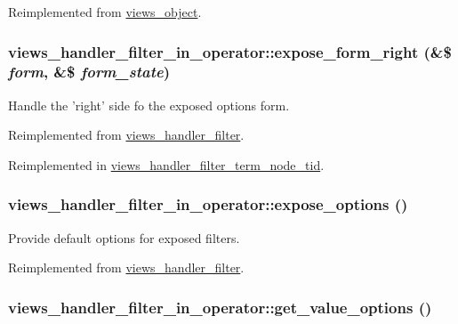 Reimplemented from \hyperlink{classviews__object_6583d6be7e59dd1e39056e320ea2c2d4}{views\_\-object}.\hypertarget{classviews__handler__filter__in__operator_512acf0d0d577f3c87882d08e9808880}{
\subsubsection[{expose\_\-form\_\-right}]{\setlength{\rightskip}{0pt plus 5cm}views\_\-handler\_\-filter\_\-in\_\-operator::expose\_\-form\_\-right (\&\$ {\em form}, \/  \&\$ {\em form\_\-state})}}
\label{classviews__handler__filter__in__operator_512acf0d0d577f3c87882d08e9808880}


Handle the 'right' side fo the exposed options form. 

Reimplemented from \hyperlink{classviews__handler__filter_5f175df5f03b5e4e23e4168870de05d8}{views\_\-handler\_\-filter}.

Reimplemented in \hyperlink{classviews__handler__filter__term__node__tid_6a3523271cc4bd41ae944dd38bf24b37}{views\_\-handler\_\-filter\_\-term\_\-node\_\-tid}.\hypertarget{classviews__handler__filter__in__operator_0ed328117721ce41a3744f0339c16527}{
\subsubsection[{expose\_\-options}]{\setlength{\rightskip}{0pt plus 5cm}views\_\-handler\_\-filter\_\-in\_\-operator::expose\_\-options ()}}
\label{classviews__handler__filter__in__operator_0ed328117721ce41a3744f0339c16527}


Provide default options for exposed filters. 

Reimplemented from \hyperlink{classviews__handler__filter_07ab6afc47bf892fb5fd5934c3f1d64c}{views\_\-handler\_\-filter}.\hypertarget{classviews__handler__filter__in__operator_a5b5df6d90f4359ed28c0c446bdc81a6}{
\subsubsection[{get\_\-value\_\-options}]{\setlength{\rightskip}{0pt plus 5cm}views\_\-handler\_\-filter\_\-in\_\-operator::get\_\-value\_\-options ()}}
\label{classviews__handler__filter__in__operator_a5b5df6d90f4359ed28c0c446bdc81a6}


